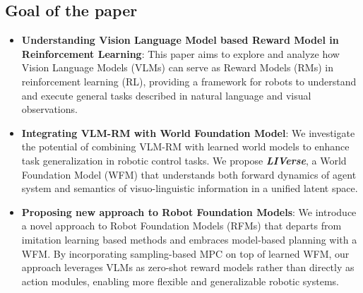 \documentclass[11pt]{article}
\begin{document}
\subsection{Goal of the paper}
\begin{itemize}
    \item \textbf{Understanding Vision Language Model based Reward Model in Reinforcement Learning}: This paper aims to explore and analyze how Vision Language Models (VLMs) can serve as Reward Models (RMs) in reinforcement learning (RL), providing a framework for robots to understand and execute general tasks described in natural language and visual observations.
    
    \item \textbf{Integrating VLM-RM with World Foundation Model}: We investigate the potential of combining VLM-RM with learned world models to enhance task generalization in robotic control tasks. We propose \textit{\textbf{LIVerse}}, a World Foundation Model (WFM) that understands both forward dynamics of agent system and semantics of visuo-linguistic information  in a unified latent space.

    \item \textbf{Proposing new approach to Robot Foundation Models}: We introduce a novel approach to Robot Foundation Models (RFMs) that departs from imitation learning based methods and embraces model-based planning with a WFM. By incorporating sampling-based MPC on top of learned WFM, our approach leverages VLMs as zero-shot reward models rather than directly as action modules, enabling more flexible and generalizable robotic systems.
\end{itemize}
\end{document}
